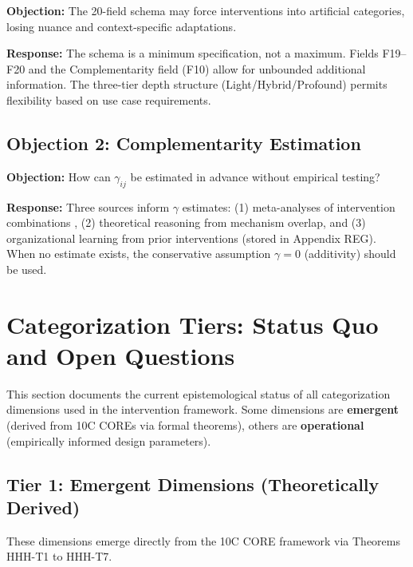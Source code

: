\textbf{Objection:} The 20-field schema may force interventions into artificial categories, losing nuance and context-specific adaptations.

\textbf{Response:} The schema is a minimum specification, not a maximum. Fields F19--F20 and the Complementarity field (F10) allow for unbounded additional information. The three-tier depth structure (Light/Hybrid/Profound) permits flexibility based on use case requirements.

\subsection{Objection 2: Complementarity Estimation}

\textbf{Objection:} How can $\gamma_{ij}$ be estimated in advance without empirical testing?

\textbf{Response:} Three sources inform $\gamma$ estimates: (1) meta-analyses of intervention combinations \citep{johnson2021}, (2) theoretical reasoning from mechanism overlap, and (3) organizational learning from prior interventions (stored in Appendix REG). When no estimate exists, the conservative assumption $\gamma = 0$ (additivity) should be used.


\section{Categorization Tiers: Status Quo and Open Questions}
\label{sec:hhh-categorization-tiers}

This section documents the current epistemological status of all categorization dimensions used in the intervention framework. Some dimensions are \textbf{emergent} (derived from 10C COREs via formal theorems), others are \textbf{operational} (empirically informed design parameters).

\subsection{Tier 1: Emergent Dimensions (Theoretically Derived)}

These dimensions emerge directly from the 10C CORE framework via Theorems HHH-T1 to HHH-T7.

